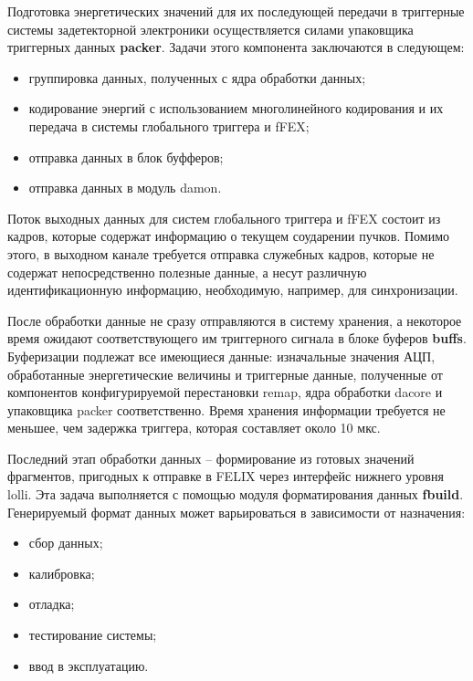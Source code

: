 Подготовка энергетических значений для их последующей передачи в триггерные системы задетекторной электроники осуществляется силами упаковщика триггерных данных \textbf{packer}. Задачи этого компонента заключаются в следующем:\par
\begin{itemize}
    \item группировка данных, полученных с ядра обработки данных;
    \item кодирование энергий с использованием многолинейного кодирования и их передача в системы глобального триггера и fFEX;
    \item отправка данных в блок буфферов;
    \item отправка данных в модуль damon.
\end{itemize}\par
Поток выходных данных для систем глобального триггера и fFEX состоит из кадров, которые содержат информацию о текущем соударении пучков. Помимо этого, в выходном канале требуется отправка служебных кадров, которые не содержат непосредственно полезные данные, а несут различную идентификационную информацию, необходимую, например, для синхронизации.\par
После обработки данные не сразу отправляются в систему хранения, а некоторое время ожидают соответствующего им триггерного сигнала в блоке буферов \textbf{buffs}. Буферизации подлежат все имеющиеся данные: изначальные значения АЦП, обработанные энергетические величины и триггерные данные, полученные от компонентов конфигурируемой перестановки remap, ядра обработки dacore и упаковщика packer соответственно. Время хранения информации требуется не меньшее, чем задержка триггера, которая составляет около 10 мкс.\par
Последний этап обработки данных -- формирование из готовых значений фрагментов, пригодных к отправке в FELIX через интерфейс нижнего уровня lolli. Эта задача выполняется с помощью модуля форматирования данных \textbf{fbuild}. Генерируемый формат данных может варьироваться в зависимости от назначения:\par
\begin{itemize}
    \item сбор данных;
    \item калибровка;
    \item отладка;
    \item тестирование системы;
    \item ввод в эксплуатацию.
\end{itemize}\par
